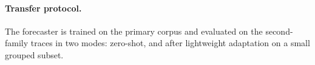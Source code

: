 \paragraph{Transfer protocol.}
The forecaster is trained on the primary corpus and evaluated on the
second-family traces in two modes: zero-shot, and after lightweight
adaptation on a small grouped subset. 
